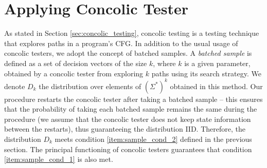 \section{Applying Concolic Tester}\label{sec:apply_concolic}

As stated in Section \ref{sec:concolic_testing}, concolic testing is a testing technique that explores paths in a program's CFG. In addition to the usual usage of concolic testers, we adopt the concept of batched samples. A \emph{batched sample} is defined as a set of decision vectors of the size $k$, where $k$ is a given parameter, obtained by a concolic tester from exploring $k$ paths using its search strategy. We denote $D_k$ the distribution over elements of $(\Sigma^\ast)^k$ obtained in this method. Our procedure restarts the concolic tester after taking a batched sample -- this ensures that the probability of taking each batched sample remains the same during the procedure (we assume that the concolic tester does not keep state information between the restarts), thus guaranteeing the distribution IID. Therefore, the distribution $D_k$ meets condition \ref{item:sample_cond_2} defined in the previous section. The principal functioning of concolic testers guarantees that condition \ref{item:sample_cond_1} is also met. 